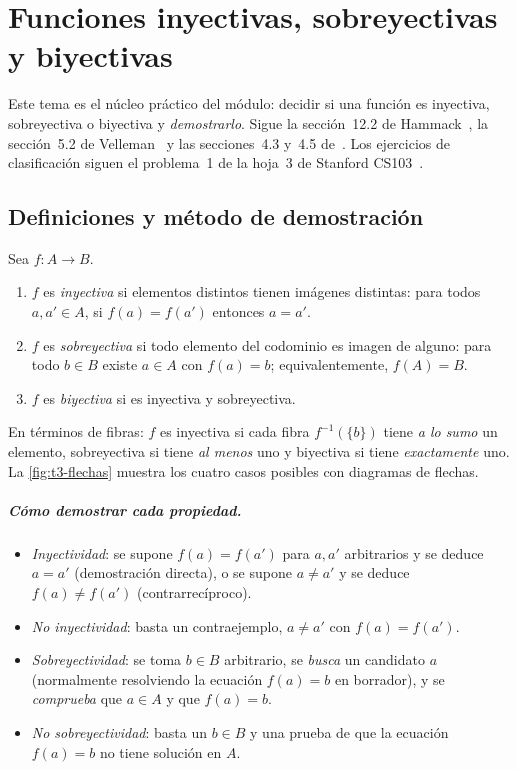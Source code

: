 \chapter{Funciones inyectivas, sobreyectivas y biyectivas}
\label{tema:3}

Este tema es el núcleo práctico del módulo: decidir si una función es inyectiva, sobreyectiva o biyectiva y \emph{demostrarlo}. Sigue la sección~12.2 de Hammack~\cite{hammack}, la sección~5.2 de Velleman~\cite{velleman} y las secciones~4.3 y~4.5 de~\cite{mcs}. Los ejercicios de clasificación siguen el problema~1 de la hoja~3 de Stanford CS103~\cite{cs103ps3}.

\section{Definiciones y método de demostración}

\begin{definicion}\label{def:t3-iny}
Sea $f\colon A\to B$.
\begin{enumerate}
  \item $f$ es \emph{inyectiva} si elementos distintos tienen imágenes distintas: para todos $a,a'\in A$, si $f(a)=f(a')$ entonces $a=a'$.
  \item $f$ es \emph{sobreyectiva} si todo elemento del codominio es imagen de alguno: para todo $b\in B$ existe $a\in A$ con $f(a)=b$; equivalentemente, $f(A)=B$.
  \item $f$ es \emph{biyectiva} si es inyectiva y sobreyectiva.
\end{enumerate}
\end{definicion}

En términos de fibras: $f$ es inyectiva si cada fibra $f^{-1}(\{b\})$ tiene \emph{a lo sumo} un elemento, sobreyectiva si tiene \emph{al menos} uno y biyectiva si tiene \emph{exactamente} uno. La \cref{fig:t3-flechas} muestra los cuatro casos posibles con diagramas de flechas.

\addtocounter{figure}{1}%

\paragraph{Cómo demostrar cada propiedad.}
\begin{itemize}[leftmargin=1.4em]
  \item \emph{Inyectividad}: se supone $f(a)=f(a')$ para $a,a'$ arbitrarios y se deduce $a=a'$ (demostración directa), o se supone $a\neq a'$ y se deduce $f(a)\neq f(a')$ (contrarrecíproco).
  \item \emph{No inyectividad}: basta un contraejemplo, $a\neq a'$ con $f(a)=f(a')$.
  \item \emph{Sobreyectividad}: se toma $b\in B$ arbitrario, se \emph{busca} un candidato $a$ (normalmente resolviendo la ecuación $f(a)=b$ en borrador), y se \emph{comprueba} que $a\in A$ y que $f(a)=b$.
  \item \emph{No sobreyectividad}: basta un $b\in B$ y una prueba de que la ecuación $f(a)=b$ no tiene solución en $A$.
\end{itemize}


